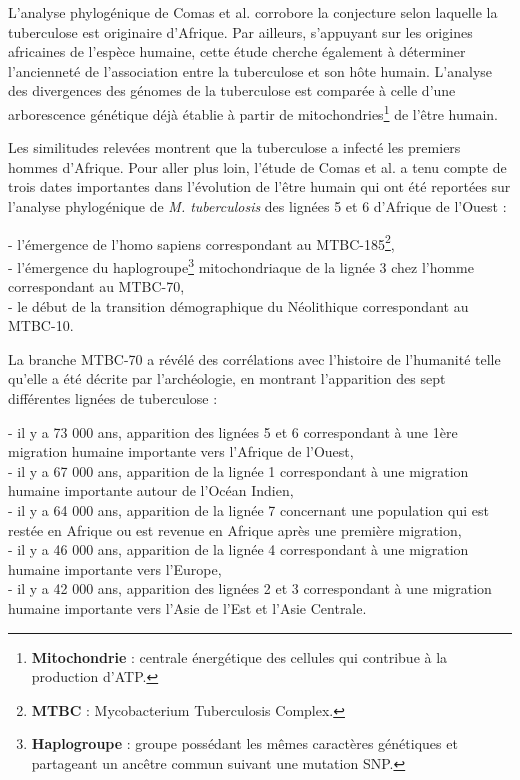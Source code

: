 \documentclass[twoside,a4paper,11pt,frenchb,openany]{report}
\begin{document}
L'analyse phylogénique de Comas et al.\cite{comas} corrobore la conjecture selon laquelle la tuberculose est originaire d'Afrique. Par ailleurs, s'appuyant sur les origines africaines de l'espèce humaine, cette étude cherche également à déterminer l'ancienneté de l'association entre la tuberculose et son hôte humain. L'analyse des divergences des génomes de la tuberculose est comparée à celle d'une arborescence génétique déjà établie à partir de mitochondries\footnote{\textbf{Mitochondrie} : centrale énergétique des cellules qui contribue à la production d'ATP.} de l'être humain. 


Les similitudes relevées montrent que la tuberculose a infecté les premiers hommes d'Afrique. Pour aller plus loin, l'étude de Comas et al.\cite{comas} a tenu compte de trois dates importantes dans l'évolution de l'être humain qui ont été reportées sur l'analyse phylogénique de \textit{M. tuberculosis} des lignées 5 et 6 d'Afrique de l'Ouest :

- l'émergence de l'homo sapiens correspondant au MTBC-185\footnote{\textbf{MTBC} : Mycobacterium Tuberculosis Complex.},\\
- l'émergence du haplogroupe\footnote{\textbf{Haplogroupe} : groupe possédant les mêmes caractères génétiques et partageant un ancêtre commun suivant une mutation SNP.} mitochondriaque de la lignée 3 chez l'homme correspondant au MTBC-70,\\
- le début de la transition démographique du Néolithique correspondant au MTBC-10.

La branche MTBC-70 a révélé des corrélations avec l'histoire de l'humanité telle qu'elle a été décrite par l'archéologie, en montrant l'apparition des sept différentes lignées de tuberculose :

- il y a 73 000 ans, apparition des lignées 5 et 6 correspondant à une 1ère migration humaine importante vers l'Afrique de l'Ouest,\\
- il y a 67 000 ans, apparition de la lignée 1 correspondant à une migration humaine importante autour de l'Océan Indien,\\
- il y a 64 000 ans, apparition de la lignée 7 concernant une population qui est restée en Afrique ou est revenue en Afrique après une première migration,\\
- il y a 46 000 ans, apparition de la lignée 4 correspondant à une migration humaine importante vers l'Europe,\\
- il y a 42 000 ans, apparition des lignées 2 et 3 correspondant à une migration humaine importante vers l'Asie de l'Est et l'Asie Centrale. 
\end{document}
